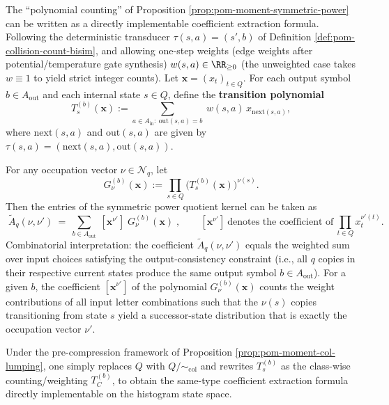 \begin{remark}\label{rem:pom-moment-symmetric-power-coefficient-extraction}
The ``polynomial counting'' of Proposition \ref{prop:pom-moment-symmetric-power} can be written as a directly implementable coefficient extraction formula.
Following the deterministic transducer \(\tau(s,a)=(s',b)\) of Definition \ref{def:pom-collision-count-bisim}, and allowing one-step weights (edge weights after potential/temperature gate synthesis)
\(
w(s,a)\in\RR_{\ge 0}
\)
(the unweighted case takes \(w\equiv 1\) to yield strict integer counts).
Let \(\mathbf{x}=(x_t)_{t\in Q}\).
For each output symbol \(b\in A_{\mathrm{out}}\) and each internal state \(s\in Q\), define the \textbf{transition polynomial}
\[
T_{s}^{(b)}(\mathbf{x})
:=\sum_{a\in A_{\mathrm{in}}:\ \mathrm{out}(s,a)=b}\ w(s,a)\,x_{\mathrm{next}(s,a)},
\]
where \(\mathrm{next}(s,a)\) and \(\mathrm{out}(s,a)\) are given by \(\tau(s,a)=(\mathrm{next}(s,a),\mathrm{out}(s,a))\).
\par
For any occupation vector \(\nu\in\mathcal{N}_q\), let
\[
G_{\nu}^{(b)}(\mathbf{x})
:=\prod_{s\in Q}\bigl(T_s^{(b)}(\mathbf{x})\bigr)^{\nu(s)}.
\]
Then the entries of the symmetric power quotient kernel can be taken as
\[
\boxed{\;
\widetilde A_q(\nu,\nu')
\ =\
\sum_{b\in A_{\mathrm{out}}}\ [\mathbf{x}^{\nu'}]\;G_{\nu}^{(b)}(\mathbf{x})\;},
\qquad
[\mathbf{x}^{\nu'}]\ \text{denotes the coefficient of}\ \prod_{t\in Q}x_t^{\nu'(t)}.
\]
Combinatorial interpretation: the coefficient \(\widetilde A_q(\nu, \nu')\) equals the weighted sum over input choices satisfying the output-consistency constraint (i.e., all \(q\) copies in their respective current states produce the same output symbol \(b \in A_{\mathrm{out}}\)). For a given \(b\), the coefficient \([\mathbf{x}^{\nu'}]\) of the polynomial \(G_{\nu}^{(b)}(\mathbf{x})\) counts the weight contributions of all input letter combinations such that the \(\nu(s)\) copies transitioning from state \(s\) yield a successor-state distribution that is exactly the occupation vector \(\nu'\).
\par
Under the pre-compression framework of Proposition \ref{prop:pom-moment-col-lumping}, one simply replaces \(Q\) with \(Q/{\sim_{\mathrm{col}}}\) and rewrites \(T_s^{(b)}\) as the class-wise counting/weighting \(T_C^{(b)}\), to obtain the same-type coefficient extraction formula directly implementable on the histogram state space.
\end{remark}

